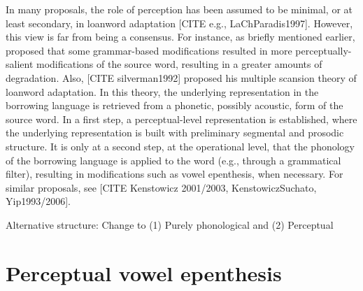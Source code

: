 In many proposals, the role of perception has been assumed to be minimal, or at least secondary, in loanword adaptation [CITE e.g., LaChParadis1997]. However, this view is far from being a consensus. For instance, as briefly mentioned earlier, \cite{steriade2001} proposed that some grammar-based modifications resulted in more perceptually-salient modifications of the source word, resulting in a greater amounts of degradation.
Also, [CITE silverman1992] proposed his multiple scansion theory of loanword adaptation. In this theory, the underlying representation in the borrowing language is retrieved from a phonetic, possibly acoustic, form of the source word. In a first step, a perceptual-level representation is established, where the underlying representation is built with preliminary segmental and prosodic structure. It is only at a second step, at the operational level, that the phonology of the borrowing language is applied to the word (e.g., through a grammatical filter), resulting in modifications such as vowel epenthesis, when necessary. For similar proposals, see [CITE Kenstowicz 2001/2003, KenstowiczSuchato, Yip1993/2006].  

{\color{red}Alternative structure: Change to (1) Purely phonological and (2) Perceptual}


\section{Perceptual vowel epenthesis}


